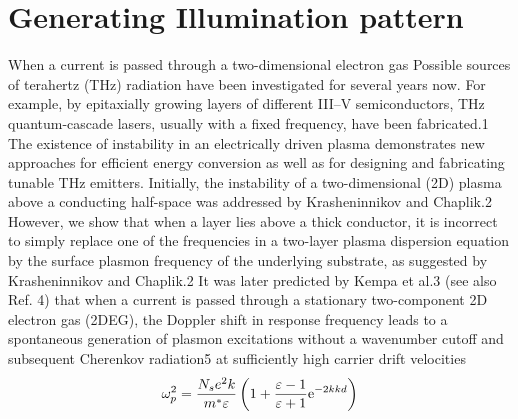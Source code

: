 \documentclass[11pt]{article}
\begin{document}
\section{Generating Illumination pattern}
%
When a current is passed through a two-dimensional electron gas Possible sources of terahertz (THz) radiation have been investigated for several years now. For example, by epitaxially growing layers of different III–V semiconductors, THz quantum-cascade lasers, usually with a fixed frequency, have
been fabricated.1 The existence of instability in an electrically driven plasma demonstrates new approaches for efficient energy conversion as well as for designing and fabricating tunable THz emitters. Initially, the instability of a
two-dimensional (2D) plasma above a conducting half-space was addressed by Krasheninnikov and Chaplik.2 However, we show that when a layer lies above a thick conductor, it is incorrect to simply replace one of the frequencies in a
two-layer plasma dispersion equation by the surface plasmon frequency of the underlying substrate, as suggested by Krasheninnikov and Chaplik.2 It was later predicted by Kempa et al.3 (see also Ref. 4) that when a current is passed
through a stationary two-component 2D electron gas (2DEG), the Doppler shift in response frequency leads to a spontaneous generation of plasmon excitations without a wavenumber cutoff and subsequent Cherenkov radiation5 at sufficiently high carrier drift velocities
%
\begin{equation}
  \omega_p^2 = \frac{N_s e^2 k}{m^{\ast}\varepsilon}\left(1 + \frac{\varepsilon - 1}{\varepsilon + 1}\mathrm{e}^{-2k  k d}\right)
  \label{eq:plasma_f_HEMT}
\end{equation}
%














\clearpage %
% 


\end{document}
